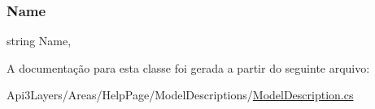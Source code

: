 \subsubsection{\texorpdfstring{Name}{Name}}
{\footnotesize\ttfamily string Name\hspace{0.3cm}{\ttfamily [get]}, {\ttfamily [set]}}



A documentação para esta classe foi gerada a partir do seguinte arquivo\+:\begin{DoxyCompactItemize}
\item 
Api3\+Layers/\+Areas/\+Help\+Page/\+Model\+Descriptions/\hyperlink{ModelDescription_8cs}{Model\+Description.\+cs}\end{DoxyCompactItemize}
